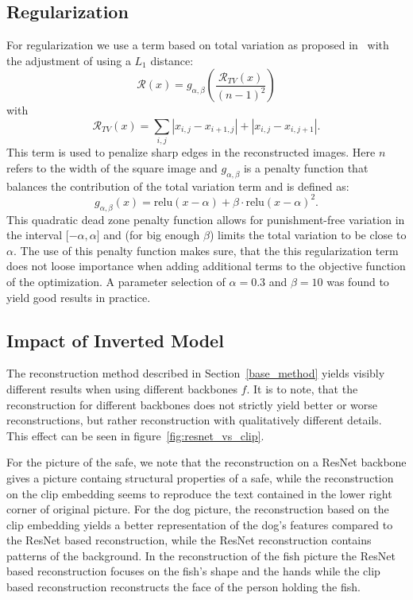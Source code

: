 \documentclass[10pt,twocolumn]{article}
\begin{document}
\subsection{Regularization}\label{reg}
For regularization we use a term based on total variation as proposed in~\cite{mahendranUnderstandingDeepImage2015} with the adjustment of using a $L_1$ distance:
$$
\mathcal{R}(x) = g_{\alpha,\beta}\left(\dfrac{\mathcal{R}_{TV}(x)}{(n-1)^2}\right)
$$
with
$$
\mathcal{R}_{TV}(x) = \sum_{i,j} \left| x_{i,j} - x_{i + 1,j} \right| + \left| x_{i,j} - x_{i,j + 1} \right|.
$$
This term is used to penalize sharp edges in the reconstructed images.
Here $n$ refers to the width of the square image and $g_{\alpha,\beta}$ is a penalty function that balances the contribution of the total variation term and is defined as:
$$
g_{\alpha,\beta}(x) = \text{relu}(x - \alpha) + \beta\cdot\text{relu}(x - \alpha) ^ 2.
$$
This quadratic dead zone penalty function allows for punishment-free variation in the interval $\lbrack-\alpha,\alpha\rbrack$ and (for big enough $\beta$) limits the total variation to be close to $\alpha$.
The use of this penalty function makes sure, that the this regularization term does not loose importance when adding additional terms to the objective function of the optimization.
A parameter selection of $\alpha = 0.3$ and $\beta = 10$ was found to yield good results in practice.

\subsection{Impact of Inverted Model}
The reconstruction method described in Section~\ref{base_method} yields visibly different results when using different backbones $f$.
It is to note, that the reconstruction for different backbones does not strictly yield better or worse reconstructions, but rather reconstruction with qualitatively different details.
This effect can be seen in figure~\ref{fig:resnet_vs_clip}.

For the picture of the safe, we note that the reconstruction on a ResNet backbone gives a picture containg structural properties of a safe, while the reconstruction on the clip embedding seems to reproduce the text contained in the lower right corner of original picture.
For the dog picture, the reconstruction based on the clip embedding yields a better representation of the dog's features compared to the ResNet based reconstruction, while the ResNet reconstruction contains patterns of the background.
In the reconstruction of the fish picture the ResNet based reconstruction focuses on the fish's shape and the hands while the clip based reconstruction reconstructs the face of the person holding the fish.
\end{document}
